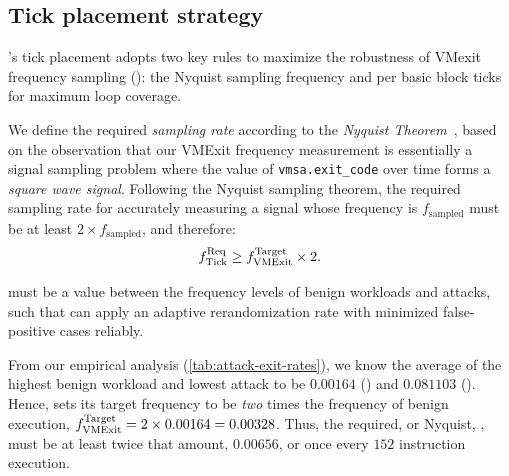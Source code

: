 \subsection{Tick placement strategy}
\label{subsec:tick-placement-strat}
\thename's tick placement adopts two key rules to maximize the robustness of VMexit frequency sampling (\reqrobustpolicy): the Nyquist sampling frequency and per basic block ticks for maximum loop coverage.

\label{subsec:tick-requirements}
We define the required \emph{sampling rate} according to the \emph{Nyquist Theorem}~\cite{nyquist},  based on the observation that our VMExit frequency measurement is essentially a signal sampling problem where the value of \texttt{vmsa.exit\_code} over time forms a \emph{square wave signal}.
Following the Nyquist sampling theorem, the required sampling rate for accurately measuring a signal whose frequency is $f_{\text{sampled}}$ must be at least $2\times f_{\text{sampled}}$, and therefore:
{
\normalsize
\begin{equation*}
	f_{\text{Tick}}^{\text{Req}} \geq f_{\text{VMExit}}^{\text{Target}} \times 2.
\end{equation*}
}

 must be a value between the frequency levels of benign workloads and attacks, such that \thename can apply an adaptive rerandomization rate with minimized false-positive cases reliably.

From our empirical analysis (\autoref{tab:attack-exit-rates}), we know the average \freqvmexitof{} of the highest benign workload and lowest attack \freqvmexitof{} to be $0.00164$ (\lnginx) and $0.081103$ (\llenpf).
Hence, \thename sets its target frequency to be \emph{two} times the frequency of benign execution, $f_{\text{VMExit}}^{\text{Target}} = 2 \times 0.00164 = 0.00328$.
Thus, the required, or Nyquist, , must be at least twice that amount, $0.00656$, or once every $152$ instruction execution.



